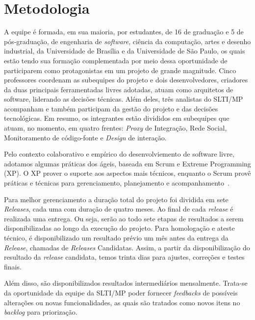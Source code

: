 \section{Metodologia}
\label{sec:metodologia}

A equipe é formada, em sua maioria, por estudantes, de 16 de graduação e 5 de
pós-graduação, de engenharia de \textit{software}, ciência da computação, artes
e desenho industrial, da Universidade de Brasília e da Universidade de São
Paulo, os quais estão tendo sua formação complementada por meio dessa
oportunidade de participarem como protagonistas em um projeto de grande
magnitude.
%
Cinco professores coordenam as subequipes do projeto e dois desenvolvedores,
criadores da duas principais ferramentadas livres adotadas, atuam como
arquitetos de software, liderando as decisões técnicas.
%
Além deles, três analistas do SLTI/MP acompanham e também participam da gestão
do projeto e das decisões tecnológicas.
%
Em resumo, os integrantes estão divididos em subequipes que atuam, no momento,
em quatro frentes: \emph{Proxy} de Integração, Rede Social, Monitoramento de
código-fonte e \textit{Design} de interação.

Pelo contexto colaborativo e empírico do desenvolviemento de software livre,
adotamos algumas práticas dos ágeis, baseada em Scrum e Extreme Programming (XP).
%
O XP prover o suporte aos aspectos mais técnicos, enquanto o Scrum provê
práticas e técnicas para gerenciamento, planejamento e
acompanhamento~\cite{schwaber2001,fitzgerald2006}. 



Para melhor gerenciamento a duração total do projeto foi dividida em sete \textit{Releases}, cada uma com duração de quatro meses. Ao final de cada \textit{release} é realizada uma entrega. Ou seja, serão ao todo sete etapas de resultados a serem disponibilizadas ao longo da execução do projeto.
Para homologação e ateste técnico, é disponibilizado um resultado prévio um mês antes da entrega da \textit{Release}, chamadas de \textit{Releases} Candidatas. Assim, a partir da disponibilização do resultado da \textit{release} candidata, temos trinta dias para ajustes, correções e testes finais. 

Além disso, são disponibilizados resultados intermediários mensalmente. Trata-se da oportunidade da equipe da SLTI/MP poder fornecer \textit{feedbacks} de possíveis alterações ou novas funcionalidades, as quais são tratados como novos itens no \textit{backlog} para priorização.

